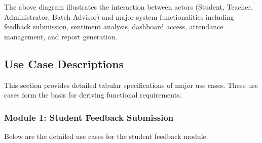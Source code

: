 The above diagram illustrates the interaction between actors (Student, Teacher, Administrator, Batch Advisor) and major system functionalities including feedback submission, sentiment analysis, dashboard access, attendance management, and report generation.


\subsection{Use Case Descriptions}

This section provides detailed tabular specifications of major use cases. These use cases form the basis for deriving functional requirements.

\subsubsection{Module 1: Student Feedback Submission}

Below are the detailed use cases for the student feedback module.

